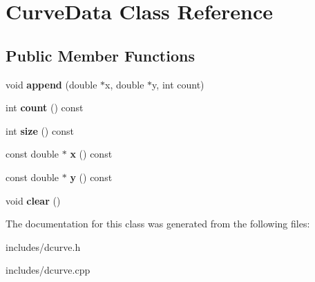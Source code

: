\hypertarget{class_curve_data}{
\section{CurveData Class Reference}
\label{class_curve_data}
}
\subsection*{Public Member Functions}
\begin{DoxyCompactItemize}
\item 
\hypertarget{class_curve_data_aa5a619af9980fa45612c98d438444b07}{
void {\bfseries append} (double $\ast$x, double $\ast$y, int count)}
\label{class_curve_data_aa5a619af9980fa45612c98d438444b07}

\item 
\hypertarget{class_curve_data_a6d3c0bbc2069cc39f265aa8e9ee5ad73}{
int {\bfseries count} () const }
\label{class_curve_data_a6d3c0bbc2069cc39f265aa8e9ee5ad73}

\item 
\hypertarget{class_curve_data_aa47747f11e103e908781800b278596d7}{
int {\bfseries size} () const }
\label{class_curve_data_aa47747f11e103e908781800b278596d7}

\item 
\hypertarget{class_curve_data_aeb1b65fe291fe72fa363640245383da4}{
const double $\ast$ {\bfseries x} () const }
\label{class_curve_data_aeb1b65fe291fe72fa363640245383da4}

\item 
\hypertarget{class_curve_data_a681ce130c86c62bcc1f6c488645f9b5b}{
const double $\ast$ {\bfseries y} () const }
\label{class_curve_data_a681ce130c86c62bcc1f6c488645f9b5b}

\item 
\hypertarget{class_curve_data_ae898810872a274a681ab60131ecf922b}{
void {\bfseries clear} ()}
\label{class_curve_data_ae898810872a274a681ab60131ecf922b}

\end{DoxyCompactItemize}


The documentation for this class was generated from the following files:\begin{DoxyCompactItemize}
\item 
includes/dcurve.h\item 
includes/dcurve.cpp\end{DoxyCompactItemize}
